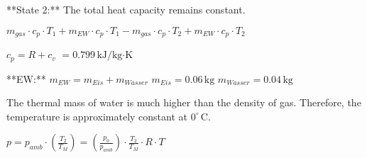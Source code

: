 **State 2:**  
The total heat capacity remains constant.  

\( m_{gas} \cdot c_p \cdot T_1 + m_{EW} \cdot c_p \cdot T_1 - m_{gas} \cdot c_p \cdot T_2 + m_{EW} \cdot c_p \cdot T_2 \)  

\( c_p = R + c_v \)  
\( = 0.799 \, \text{kJ/kg·K} \)  

**EW:**  
\( m_{EW} = m_{Eis} + m_{Wasser} \)  
\( m_{Eis} = 0.06 \, \text{kg} \)  
\( m_{Wasser} = 0.04 \, \text{kg} \)  

The thermal mass of water is much higher than the density of gas. Therefore, the temperature is approximately constant at \( 0^\circ \, \text{C} \).  

\( p = p_{amb} \cdot \left( \frac{T_2}{T_M} \right) = \left( \frac{p_0}{p_{amb}} \right) \cdot \frac{T_2}{T_M} \cdot R \cdot T \)